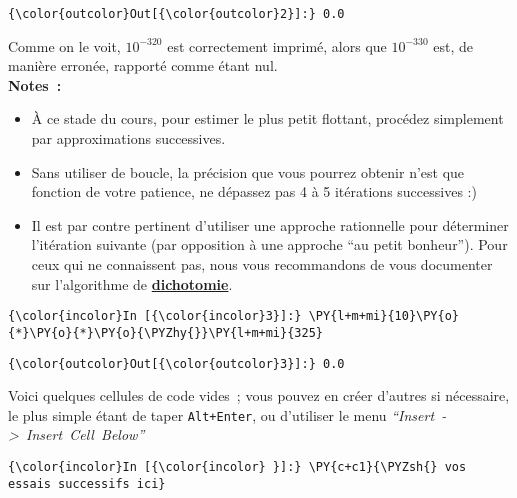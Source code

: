 \begin{Verbatim}[commandchars=\\\{\}]
{\color{outcolor}Out[{\color{outcolor}2}]:} 0.0
\end{Verbatim}
            
    Comme on le voit, \(10^{-320}\) est correctement imprimé, alors que
\(10^{-330}\) est, de manière erronée, rapporté comme étant nul.\\

    \textbf{Notes~:}

\begin{itemize}
\item
  À ce stade du cours, pour estimer le plus petit flottant, procédez
  simplement par approximations successives.
\item
  Sans utiliser de boucle, la précision que vous pourrez obtenir n'est
  que fonction de votre patience, ne dépassez pas 4 à 5 itérations
  successives :)
\item
  Il est par contre pertinent d'utiliser une approche rationnelle pour
  déterminer l'itération suivante (par opposition à une approche ``au
  petit bonheur''). Pour ceux qui ne connaissent pas, nous vous
  recommandons de vous documenter sur l'algorithme de
  \href{https://fr.wikipedia.org/wiki/Recherche_dichotomique}{\textbf{dichotomie}}.
\end{itemize}

    \begin{Verbatim}[commandchars=\\\{\}]
{\color{incolor}In [{\color{incolor}3}]:} \PY{l+m+mi}{10}\PY{o}{*}\PY{o}{*}\PY{o}{\PYZhy{}}\PY{l+m+mi}{325}
\end{Verbatim}


\begin{Verbatim}[commandchars=\\\{\}]
{\color{outcolor}Out[{\color{outcolor}3}]:} 0.0
\end{Verbatim}
            
    Voici quelques cellules de code vides~; vous pouvez en créer d'autres si
nécessaire, le plus simple étant de taper \texttt{Alt+Enter}, ou
d'utiliser le menu \emph{``Insert~-\textgreater{}~Insert~Cell~Below''}

    \begin{Verbatim}[commandchars=\\\{\}]
{\color{incolor}In [{\color{incolor} }]:} \PY{c+c1}{\PYZsh{} vos essais successifs ici}
\end{Verbatim}



